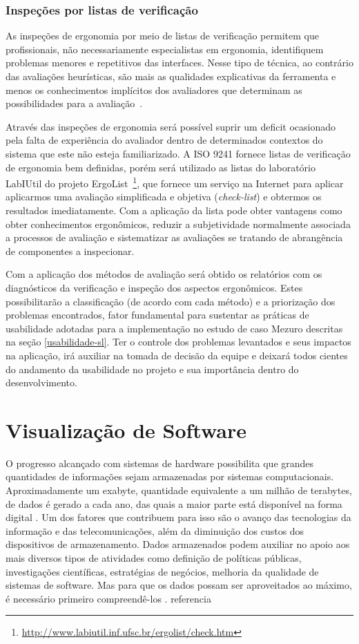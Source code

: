 \subsubsection{Inspeções por listas de verificação}
\label{inspeções-listas}
As inspeções de ergonomia por meio de listas de verificação permitem que
profissionais, não necessariamente especialistas em ergonomia, identifiquem
problemas menores e repetitivos das interfaces.
%
Nesse tipo de técnica, ao contrário das avaliações heurísticas, são mais as
qualidades explicativas da ferramenta e menos os conhecimentos implícitos dos
avaliadores que determinam as possibilidades para a avaliação~\cite{cybis2010}.

%
Através das inspeções de ergonomia será possível suprir um deficit ocasionado
pela falta de experiência do avaliador dentro de determinados contextos do
sistema que este não esteja familiarizado.
%
A ISO 9241 fornece listas de verificação de ergonomia bem definidas, porém será
utilizado as listas do laboratório LabIUtil do projeto
ErgoList~\footnote{\url{http://www.labiutil.inf.ufsc.br/ergolist/check.htm}},
que fornece um serviço na Internet para aplicar aplicarmos uma avaliação
simplificada e objetiva (\textit{check-list}) e obtermos os resultados
imediatamente.
%
Com a aplicação da lista pode obter vantagens como obter conhecimentos
ergonômicos, reduzir a subjetividade normalmente associada a processos de
avaliação e sistematizar as avaliações se tratando de abrangência de componentes
a inspecionar.

Com a aplicação dos métodos de avaliação será obtido os relatórios com os diagnósticos da verificação e inspeção dos aspectos ergonômicos. Estes possibilitarão a classificação (de acordo com cada método) e a priorização dos problemas encontrados, fator fundamental para sustentar as práticas de usabilidade adotadas para a implementação no estudo de caso Mezuro descritas na seção \ref{usabilidade-sl}. Ter o controle dos problemas levantados e seus impactos na aplicação, irá auxiliar na tomada de decisão da equipe e deixará todos cientes do andamento da usabilidade no projeto e sua importância dentro do desenvolvimento. 

\section{Visualização de Software}
\label{sec-visualizacao}
O progresso alcançado com sistemas de hardware possibilita que grandes quantidades de informações sejam armazenadas por sistemas computacionais. Aproximadamente um exabyte, quantidade equivalente a um milhão de terabytes, de dados é gerado a cada ano, das quais a maior parte está disponível na forma digital \cite{keim2002information}. Um dos fatores que contribuem para isso são o avanço das tecnologias da informação e das telecomunicações, além da diminuição dos custos dos dispositivos de armazenamento. Dados armazenados podem auxiliar no apoio aos mais diversos tipos de atividades como definição de políticas públicas, investigações científicas, estratégias de negócios, melhoria da qualidade de sistemas de software. Mas para que os dados possam ser aproveitados ao máximo, é necessário primeiro compreendê-los \cite{heer2012interactive}. referencia

